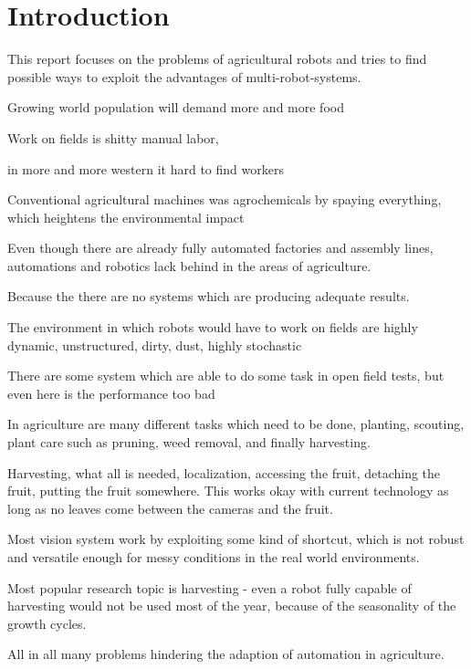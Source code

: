\newcommand*\rot{\rotatebox{90}}

    \chapter{Introduction}

    This report focuses on the problems of agricultural robots and tries to find possible ways to exploit the advantages of multi-robot-systems. 

    Growing world population will demand more and more food 

    Work on fields is shitty manual labor, 
    
    in more and more western it hard to find workers 

    Conventional agricultural machines was agrochemicals by spaying everything, which heightens the environmental impact

    Even though there are already fully automated factories and assembly lines, automations and robotics lack behind in the areas of agriculture.

    Because the there are no systems which are producing adequate results. 

    The environment in which robots would have to work on fields are highly dynamic, unstructured, dirty, dust, highly stochastic 

    There are some system which are able to do some task in open field tests, but even here is the performance too bad

    In agriculture are many different tasks which need to be done, planting, scouting, plant care such as pruning, weed removal, and finally harvesting. 
    
    Harvesting, what all is needed, localization, accessing the fruit, detaching the fruit, putting the fruit somewhere. This works okay with current technology as long as no leaves come between the cameras and the fruit. 

    Most vision system work by exploiting some kind of shortcut, which is not robust and versatile enough for messy conditions in the real world environments.

    Most popular research topic is harvesting - even a robot fully capable of harvesting would not be used most of the year, because of the seasonality of the growth cycles.

    All in all many problems hindering the adaption of automation in agriculture. 




